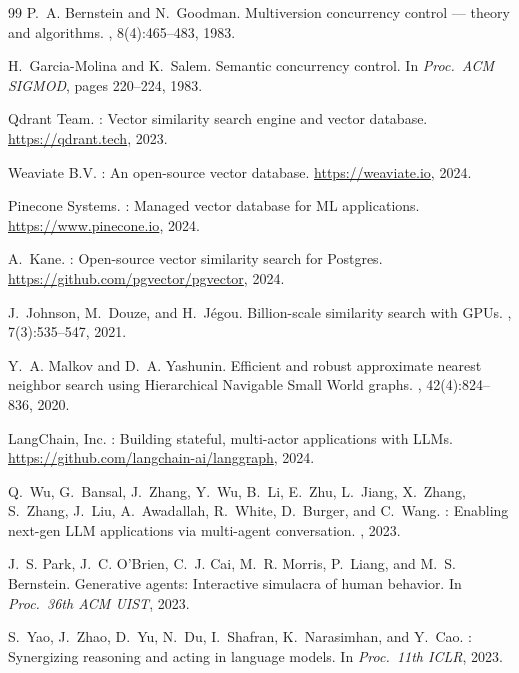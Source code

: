 \documentclass[sigconf]{acmart}
\begin{document}
\begin{thebibliography}{99}
P.~A. Bernstein and N.~Goodman.
\newblock Multiversion concurrency control --- theory and algorithms.
, 8(4):465--483, 1983.

H.~Garcia-Molina and K.~Salem.
\newblock Semantic concurrency control.
\newblock In {\em Proc.\ ACM SIGMOD}, pages 220--224, 1983.

{Qdrant Team}.
: Vector similarity search engine and vector database.
\newblock \url{https://qdrant.tech}, 2023.

{Weaviate B.V.}
: An open-source vector database.
\newblock \url{https://weaviate.io}, 2024.

{Pinecone Systems}.
: Managed vector database for {ML} applications.
\newblock \url{https://www.pinecone.io}, 2024.

A.~Kane.
: Open-source vector similarity search for {Postgres}.
\newblock \url{https://github.com/pgvector/pgvector}, 2024.

J.~Johnson, M.~Douze, and H.~J\'{e}gou.
\newblock Billion-scale similarity search with {GPUs}.
, 7(3):535--547, 2021.

Y.~A. Malkov and D.~A. Yashunin.
\newblock Efficient and robust approximate nearest neighbor search using
  {Hierarchical Navigable Small World} graphs.
,
  42(4):824--836, 2020.

{LangChain, Inc.}
: Building stateful, multi-actor applications with
  {LLMs}.
\newblock \url{https://github.com/langchain-ai/langgraph}, 2024.

Q.~Wu, G.~Bansal, J.~Zhang, Y.~Wu, B.~Li, E.~Zhu, L.~Jiang, X.~Zhang,
  S.~Zhang, J.~Liu, A.~Awadallah, R.~White, D.~Burger, and C.~Wang.
: Enabling next-gen {LLM} applications via multi-agent
  conversation.
, 2023.

J.~S. Park, J.~C. O'Brien, C.~J. Cai, M.~R. Morris, P.~Liang, and
  M.~S. Bernstein.
\newblock Generative agents: Interactive simulacra of human behavior.
\newblock In {\em Proc.\ 36th ACM UIST}, 2023.

S.~Yao, J.~Zhao, D.~Yu, N.~Du, I.~Shafran, K.~Narasimhan, and Y.~Cao.
: Synergizing reasoning and acting in language models.
\newblock In {\em Proc.\ 11th ICLR}, 2023.


\end{thebibliography}
\end{document}
